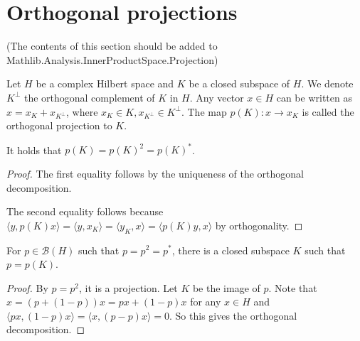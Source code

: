 %

\section{Orthogonal projections}
(The contents of this section should be added to Mathlib.Analysis.InnerProductSpace.Projection)

Let $H$ be a complex Hilbert space and $K$ be a closed subspace of $H$.
We denote $K^\perp$ the orthogonal complement of $K$ in $H$.
Any vector $x \in H$ can be written as $x = x_K + x_{K^\perp}$, where $x_K \in K, x_{K^\perp} \in K^\perp$.
The map $p(K) : x \to x_K$ is called the orthogonal projection to $K$.
\begin{lemma}
 It holds that $p(K) = p(K)^2 = p(K)^*$.
\end{lemma}
\begin{proof}
 The first equality follows by the uniqueness of the orthogonal decomposition.

 The second equality follows because $\langle y, p(K)x \rangle = \langle y, x_K\rangle = \langle y_K, x \rangle = \langle p(K)y, x\rangle$
 by orthogonality.
\end{proof}

\begin{lemma}
 For $p \in \mathcal{B}(H)$ such that $p = p^2 = p^*$,
 there is a closed subspace $K$ such that $p = p(K)$.
\end{lemma}
\begin{proof}
 By $p = p^2$, it is a projection. Let $K$ be the image of $p$.
 Note that $x = (p + (1-p))x = px + (1-p)x$ for any $x \in H$
 and $\langle px, (1-p)x\rangle = \langle x, (p-p)x\rangle = 0$.
 So this gives the orthogonal decomposition.
\end{proof}

